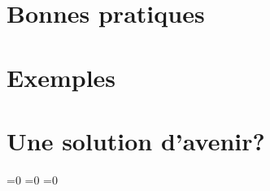 \documentclass[11pt,a4paper]{article}
\begin{document}
\section{Bonnes pratiques}


\section{Exemples}






\section{Une solution d'avenir?}




%
%

\makeatletter
\ifnum{}=0
\clearpage
\else\ifnum{}=0
\clearpage
\else\ifnum{}=0
\clearpage
\fi\fi\fi

\end{document}
